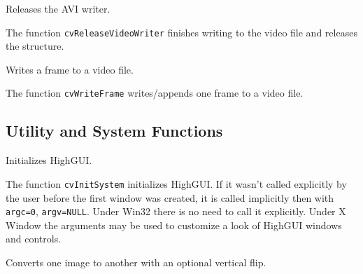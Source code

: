 Releases the AVI writer.


\begin{description}
\end{description}

The function \texttt{cvReleaseVideoWriter} finishes writing to the video file and releases the structure.
\fi


Writes a frame to a video file.


\begin{description}
\end{description}

The function \texttt{cvWriteFrame} writes/appends one frame to a video file.

\ifC
\subsection{Utility and System Functions}


Initializes HighGUI.


\begin{description}
\end{description}

The function \texttt{cvInitSystem} initializes HighGUI. If it wasn't
called explicitly by the user before the first window was created, it is
called implicitly then with \texttt{argc=0}, \texttt{argv=NULL}. Under
Win32 there is no need to call it explicitly. Under X Window the arguments
may be used to customize a look of HighGUI windows and controls.


Converts one image to another with an optional vertical flip.

